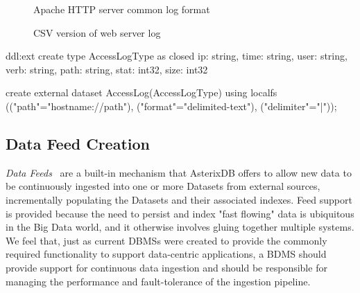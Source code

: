 
\begin{figure}

\caption{Apache HTTP server common log format\label{fig:apache-log}}
\end{figure}

\begin{figure}

\caption{CSV version of web server log\label{fig:csv-log}}
\end{figure}

\begin{ddl}{ddl:ext}
create type AccessLogType as closed {
    ip: string,
    time: string,
    user: string,
    verb: string,
    path: string,
    stat: int32,
    size: int32
}

create external dataset AccessLog(AccessLogType)
    using localfs
        (("path"="{hostname}://{path}"),
         ("format"="delimited-text"),
         ("delimiter"="|"));
\end{ddl}


\subsection{Data Feed Creation}\label{ss:feeds}

\emph{Data Feeds}~\cite{DBLP:conf/edbt/GroverC15} are a built-in mechanism that AsterixDB offers to allow new data to be continuously ingested into one or more Datasets from external sources, incrementally populating the Datasets and their associated indexes.
Feed support is provided because the need to persist and index "fast flowing" data is ubiquitous in the Big Data world, and it otherwise involves gluing together multiple systems. 
We feel that, just as current DBMSs were created to provide the commonly required functionality to support data-centric applications, a BDMS should provide support for continuous data ingestion and should be responsible for managing the performance and fault-tolerance of the ingestion pipeline.

